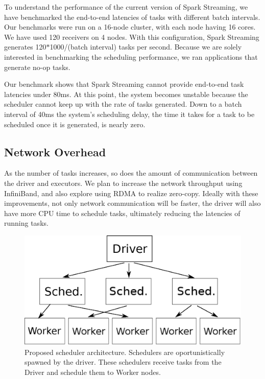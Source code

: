 To understand the performance of the current version of Spark Streaming, we have benchmarked the end-to-end latencies of tasks with different batch intervals. 
Our benchmarks were run on a 16-node cluster, with each node having 16 cores. We have used 120 receivers on 4 nodes. 
With this configuration, Spark Streaming generates 120$*$1000/(batch interval) tasks per second.
Because we are solely interested in benchmarking the scheduling performance, we ran applications that generate no-op tasks.

Our benchmark shows that Spark Streaming cannot provide end-to-end task latencies under 80ms. At this point, the system becomes unstable because the scheduler cannot keep up with the rate of tasks generated. Down to a batch interval of 40ms the system's scheduling delay, the time it takes for a task to be scheduled once it is generated, is nearly zero.


\subsection{Network Overhead}
As the number of tasks increases, so does the amount of communication between the driver and executors. We plan to increase the network throughput using InfiniBand, and also explore using RDMA to realize zero-copy. Ideally with these improvements, not only network communication will be faster, the driver will also have more CPU time to schedule tasks, ultimately reducing the latencies of running tasks.


\begin{figure}[t!]
  \begin{center}
    \includegraphics[scale=0.45]{scheduler_architecture.eps}
  \end{center}
  \caption{Proposed scheduler architecture. Schedulers are oportunistically spawned by the driver. These schedulers receive tasks from the Driver and schedule them to Worker nodes.}
  \label{fig:schedarch}
\end{figure}

